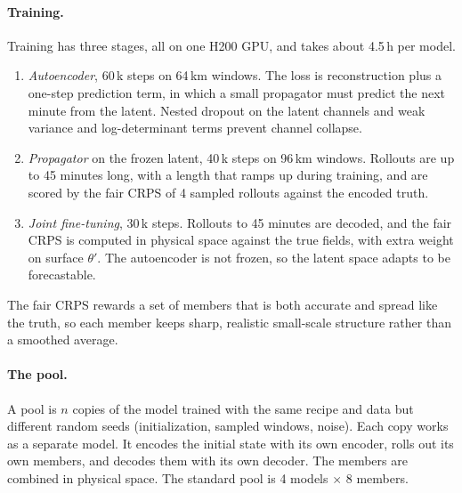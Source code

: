 \documentclass[11pt]{article}
\begin{document}
\paragraph{Training.} Training has three stages, all on one H200 GPU, and takes about 4.5\,h per model.
\begin{enumerate}
\item[A.] \emph{Autoencoder}, 60\,k steps on 64\,km windows. The loss is reconstruction plus a one-step prediction term, in which a small propagator must predict the next minute from the latent. Nested dropout on the latent channels and weak variance and log-determinant terms prevent channel collapse.
\item[B.] \emph{Propagator} on the frozen latent, 40\,k steps on 96\,km windows. Rollouts are up to 45 minutes long, with a length that ramps up during training, and are scored by the fair CRPS of 4 sampled rollouts against the encoded truth.
\item[C.] \emph{Joint fine-tuning}, 30\,k steps. Rollouts to 45 minutes are decoded, and the fair CRPS is computed in physical space against the true fields, with extra weight on surface $\theta'$. The autoencoder is not frozen, so the latent space adapts to be forecastable.
\end{enumerate}
The fair CRPS rewards a set of members that is both accurate and spread like the truth, so each member keeps sharp, realistic small-scale structure rather than a smoothed average.

\paragraph{The pool.} A pool is $n$ copies of the model trained with the same recipe and data but different random seeds (initialization, sampled windows, noise). Each copy works as a separate model. It encodes the initial state with its own encoder, rolls out its own members, and decodes them with its own decoder. The members are combined in physical space. The standard pool is 4 models $\times$ 8 members.
\end{document}
